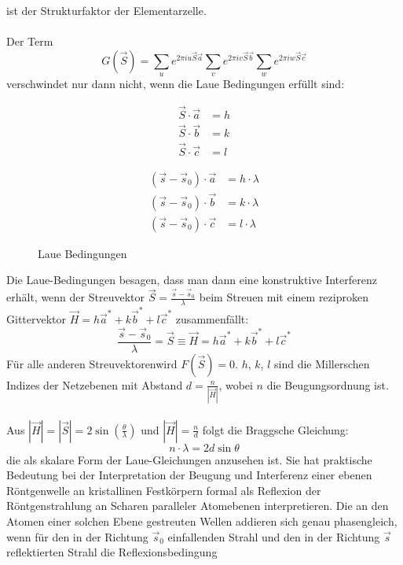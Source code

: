 \documentclass[a4paper,titlepage]{scrartcl}
\numberwithin{equation}{section}
\begin{document}
ist der Strukturfaktor der Elementarzelle.\\ \\
Der Term
\begin{equation*}
G(\vec{S})=\sum_u e^{2 \pi i u \vec{S} \vec{a}} \sum_v e^{2 \pi i v \vec{S} \vec{b}} \sum_w e^{2 \pi i w \vec{S} \vec{c}}
\end{equation*}
verschwindet nur dann nicht, wenn die Laue Bedingungen erfüllt sind:
\begin{figure}[H]
\begin{minipage}{.5\linewidth}
\begin{align*}
\vec{S} \cdot \vec{a}&=h\\
\vec{S} \cdot \vec{b}&=k\\
\vec{S} \cdot \vec{c}&=l
\end{align*}
\end{minipage}
\begin{minipage}{.5\linewidth}
\begin{align*}
(\vec{s}-\vec{s}_0) \cdot \vec{a}&=h \cdot \lambda \\
(\vec{s}-\vec{s}_0) \cdot \vec{b}&=k \cdot \lambda \\
(\vec{s}-\vec{s}_0) \cdot \vec{c}&=l \cdot \lambda
\end{align*}
\end{minipage}
\caption*{Laue Bedingungen}
\end{figure}
Die Laue-Bedingungen besagen, dass man dann eine konstruktive Interferenz erhält, wenn der Streuvektor $\vec{S}=\frac{\vec{s}-\vec{s}_0}{\lambda}$ beim Streuen mit einem reziproken Gittervektor $\vec{H}=h \vec{a}^*+k \vec{b}^* + l \vec{c}^*$ zusammenfällt:
\begin{equation*}
\frac{\vec{s}-\vec{s}_0}{\lambda}=\vec{S} \equiv \vec{H}=h \vec{a}^*+k \vec{b}^* + l \vec{c}^*
\end{equation*}
Für alle anderen Streuvektorenwird $F(\vec{S})=0$. $h$, $k$, $l$ sind die Millerschen Indizes der Netzebenen mit Abstand $d=\frac{n}{| \vec{H} |}$, wobei $n$ die Beugungsordnung ist.\\ \\
Aus $|\vec{H}|=|\vec{S}|=2 \sin{(\frac{\theta}{\lambda})}$ und $|\vec{H}|=\frac{n}{d}$ folgt die Braggsche Gleichung:
\begin{equation*}
n \cdot \lambda = 2d \sin{\theta}
\end{equation*}
die als skalare Form der Laue-Gleichungen anzusehen ist. Sie hat praktische Bedeutung bei der Interpretation der Beugung und Interferenz einer ebenen Röntgenwelle an kristallinen Festkörpern formal als Reflexion der Röntgenstrahlung an Scharen paralleler Atomebenen interpretieren. Die an den Atomen einer solchen Ebene gestreuten Wellen addieren sich genau phasengleich, wenn für den in der Richtung $\vec{s}_0$ einfallenden Strahl und den in der Richtung $\vec{s}$ reflektierten Strahl die Reflexionsbedingung
\end{document}
